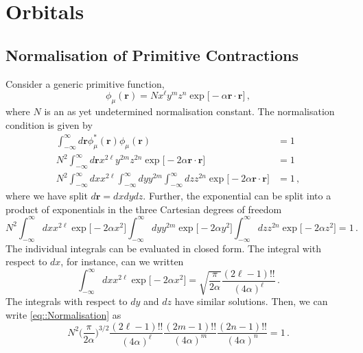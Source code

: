 \section{Orbitals}
\subsection{Normalisation of Primitive Contractions}

Consider a generic primitive function,
%
\begin{equation}
	\phi_\mu(\mathbf{r}) = N x^\ell y^m z^n \exp\Big[ -\alpha \mathbf{r}\cdot \mathbf{r} \Big]\,,
\end{equation}
%
where $N$ is an as yet undetermined normalisation constant. The normalisation condition is given by
%
\begin{align}
	\int^\infty_{-\infty} d\mathbf{r} \phi_\mu^*(\mathbf{r})\phi_\mu(\mathbf{r}) &= 1 \\
    N^2 \int_{-\infty}^{\infty} d\mathbf{r} x^{2\ell} y^{2m} z^{2n} \exp\Big[ -2\alpha \mathbf{r}\cdot\mathbf{r} \Big] &= 1 \\
    N^2 \int_{-\infty}^\infty dx x^{2\ell} \int_{-\infty}^\infty dy y^{2m} \int_{-\infty}^\infty dz z^{2n} \exp\Big[ -2\alpha \mathbf{r}\cdot\mathbf{r} \Big] &= 1 \,,
\end{align}
%
where we have split $d\mathbf{r} = dxdydz$. Further, the exponential can be split into a product of 
exponentials in the three Cartesian degrees of freedom
%
\begin{equation}\label{eq::Normalisation}
	N^2 \int_{-\infty}^\infty dx x^{2\ell} \exp\Big[ -2\alpha x^2 \Big] \int_{-\infty}^\infty dy y^{2m} \exp\Big[ -2\alpha y^2 \Big] \int_{-\infty}^\infty dz z^{2n} \exp\Big[ -2\alpha z^2 \Big]  = 1\,.
\end{equation}
%
The individual integrals can be evaluated in closed form. The integral with respect to $dx$, for 
instance, can we written
%
\begin{equation}
	\int_{-\infty}^\infty dx x^{2\ell} \exp\Big[ -2\alpha x^2 \Big] = \sqrt{\frac{\pi}{2\alpha}} \frac{(2\ell - 1)!!}{(4\alpha)^\ell}\,.
\end{equation}
%
The integrals with respect to $dy$ and $dz$ have similar solutions. Then, we can write 
\eqref{eq::Normalisation} as
%
\begin{equation}
	N^2 \Bigg(\frac{\pi}{2\alpha}\Bigg)^{3/2} \frac{(2\ell - 1)!!}{(4\alpha)^\ell} \frac{(2m - 1)!!}{(4\alpha)^m}\frac{(2n - 1)!!}{(4\alpha)^n} = 1\,.
\end{equation}
